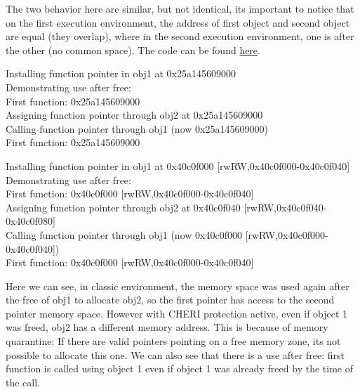 \documentclass[a4paper, 11pt]{article}
\begin{document}
		
	
	
		The two behavior here are similar, but not identical, its important to notice that on the first execution environment, the address of first object and second object are equal (they overlap), where in the second execution environment, one is after the other (no common space).
		The code can be found \href{https://ctsrd-cheri.github.io/cheri-exercises/exercises/cheri-allocator/index.html}{here}.
		\begin{tcolorbox}[colback=gray!5!white, colframe=gray!75!black, title=Output on classic \Gls{risc-v} environment (no CHERI Protection)]
			Installing function pointer in obj1 at 0x25a145609000\\
			Demonstrating use after free:\\
			First function: 0x25a145609000\\
			Assigning function pointer through obj2 at 0x25a145609000\\
			Calling function pointer through obj1 (now 0x25a145609000)\\
			First function: 0x25a145609000
		\end{tcolorbox}
		\begin{tcolorbox}[colback=gray!5!white, colframe=blue!75!black, title=Output on CHERI protected environment]
			Installing function pointer in obj1 at 0x40c0f000 [rwRW,0x40c0f000-0x40c0f040]\\
			Demonstrating use after free:\\
			First function: 0x40c0f000 [rwRW,0x40c0f000-0x40c0f040]\\
			Assigning function pointer through obj2 at 0x40c0f040 [rwRW,0x40c0f040-0x40c0f080]\\
			Calling function pointer through obj1 (now 0x40c0f000  [rwRW,0x40c0f000-0x40c0f040])\\
			First function: 0x40c0f000 [rwRW,0x40c0f000-0x40c0f040]
		\end{tcolorbox}
		Here we can see, in classic environment, the memory space was used again after the free of obj1 to allocate obj2, so the first pointer has access to the second pointer memory space. However with CHERI protection active, even if object 1 was freed, obj2 has a different memory address.
		This is because of memory quarantine: If there are valid pointers pointing on a free memory zone, its not possible to allocate this one.
		We can also see that there is a use after free: first function is called using object 1 even if object 1 was already freed by the time of the call.
\end{document}
